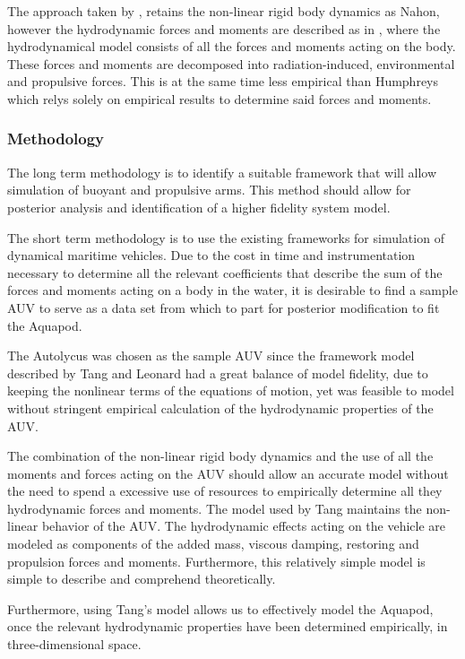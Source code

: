 The approach taken by \cite{Tang1999}, retains the non-linear rigid body
dynamics as Nahon, however the hydrodynamic forces and moments are described as
in \cite{Fossen2011}, where the hydrodynamical model consists of all the forces
and moments acting on the body. These forces and moments are decomposed into
radiation-induced, environmental and propulsive forces. This is at the same time
less empirical than Humphreys \cite{Humphreys1981} which relys solely on
empirical results to determine said forces and moments.

\subsubsection{Methodology}

The long term methodology is to identify a suitable framework that will allow
simulation of buoyant and propulsive arms. This method should allow for
posterior analysis and identification of a higher fidelity system model.

The short term methodology is to use the existing frameworks for simulation of
dynamical maritime vehicles. Due to the cost in time and instrumentation
necessary to determine all the relevant coefficients that describe the sum of
the forces and moments acting on a body in the water, it is desirable to find a
sample AUV to serve as a data set from which to part for posterior modification
to fit the Aquapod.

The Autolycus was chosen as the sample AUV since the framework model described
by Tang and Leonard \cite{Tang1999} had a great balance of model fidelity, due
to keeping the nonlinear terms of the equations of motion, yet was feasible to
model without stringent empirical calculation of the hydrodynamic properties of
the AUV.

The combination of the non-linear rigid body dynamics and the use of all the
moments and forces acting on the AUV should allow an accurate model without the
need to spend a excessive use of resources to empirically determine all they
hydrodynamic forces and moments. The model used by Tang \cite{Tang1999}
maintains the non-linear behavior of the AUV. The hydrodynamic effects acting on
the vehicle are modeled as components of the added mass, viscous damping,
restoring and propulsion forces and moments. Furthermore, this relatively simple
model is simple to describe and comprehend theoretically.

Furthermore, using Tang's model allows us to effectively model the Aquapod, once
the relevant hydrodynamic properties have been determined empirically, in
three-dimensional space.




